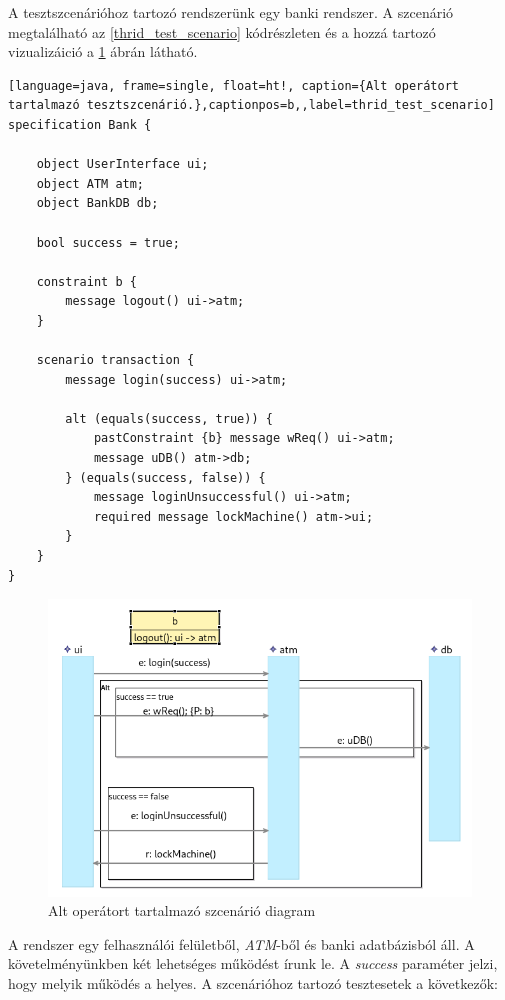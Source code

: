 A tesztszcenárióhoz tartozó rendszerünk egy banki rendszer.
A szcenárió megtalálható az \ref{thrid_test_scenario} kódrészleten és a hozzá tartozó vizualizáició a \ref{third_visualisation} ábrán látható.

\begin{lstlisting}[language=java, frame=single, float=ht!, caption={Alt operátort tartalmazó tesztszcenárió.},captionpos=b,,label=thrid_test_scenario]
specification Bank {

    object UserInterface ui;
    object ATM atm;
    object BankDB db;

    bool success = true;

    constraint b {
        message logout() ui->atm;
    }

    scenario transaction {
        message login(success) ui->atm;

        alt (equals(success, true)) {
            pastConstraint {b} message wReq() ui->atm;
            message uDB() atm->db;
        } (equals(success, false)) {
            message loginUnsuccessful() ui->atm;
            required message lockMachine() atm->ui;
        }
    }
}
\end{lstlisting}

\begin{figure}[!ht]
    \centering
    \includegraphics[width=120mm, keepaspectratio]{figures/diagramAltExample.png}
    \caption{Alt operátort tartalmazó szcenárió diagram}
    \label{third_visualisation}
\end{figure}

A rendszer egy felhasználói felületből, \textit{ATM}-ből és banki adatbázisból áll.
A követelményünkben két lehetséges működést írunk le.
A \textit{success} paraméter jelzi, hogy melyik működés a helyes.
A szcenárióhoz tartozó tesztesetek a következők:

